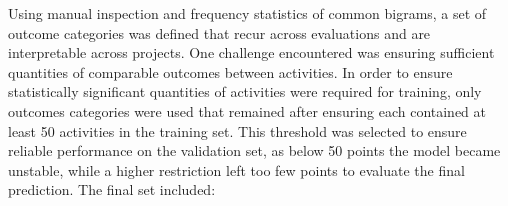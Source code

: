 Using manual inspection and frequency statistics of common bigrams, a set of outcome categories was defined that recur across evaluations and are interpretable across projects. One challenge encountered was ensuring sufficient quantities of comparable outcomes between activities. In order to ensure statistically significant quantities of activities were required for training, only outcomes categories were used that remained after ensuring each contained at least 50 activities in the training set. This threshold was selected to ensure reliable performance on the validation set, as below 50 points the model became unstable, while a higher restriction left too few points to evaluate the final prediction. The final set included:
\begin{itemize}[noitemsep,topsep=0pt]

\end{itemize}
